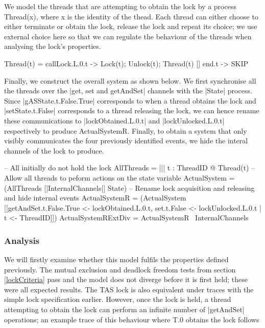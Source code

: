 We model the threads that are attempting to obtain the lock by a process Thread(x), where x is the identity of the thead. Each thread can either choose to either terminate or obtain the lock, release the lock and repeat its choice; we use external choice here so that we can regulate the  behaviour of the threads when analysing the lock's properties.

\begin{cspm}
  Thread(t) = callLock.L.0.t -> Lock(t); Unlock(t); Thread(t)
              [] end.t -> SKIP
\end{cspm}

Finally, we construct the overall system as shown below. We first synchronise all the threads over the |get, set and getAndSet| channels with the |State| process. Since |gASState.t.False.True| corresponds to when a thread obtains the lock and |setState.t.False| corresponds to a thread releasing the lock, we can hence rename these communications to |lockObtained.L.0.t| and |lockUnlocked.L.0.t| respectively to produce ActualSystemR. Finally, to obtain a system that only visibly communicates the four previously identified events, we hide the interal channels of the lock to produce.

\begin{cspm}
  -- All initially do not hold the lock
  AllThreads = ||| t : ThreadID @ Thread(t)
  -- Allow all threads to peform actions on the state variable
  ActualSystem = (AllThreads [|InternalChannels|] State)
  -- Rename lock acquisition and releasing and hide internal events
  ActualSystemR = (ActualSystem 
                    [[getAndSet.t.False.True <- lockObtained.L.0.t, 
                    set.t.False <- lockUnlocked.L.0.t | t <- ThreadID]])
  ActualSystemRExtDiv = ActualSystemR \ InternalChannels
\end{cspm}

\subsubsection{Analysis}

We will firstly examine whether this model fulfils the properties defined previously. The mutual exclusion and deadlock freedom tests from section \ref{lockCriteria} pass and the model does not diverge before it is first held; these were all expected results. The TAS lock is also equivalent under traces with the simple lock specification earlier. However, once the lock is held, a thread attempting to obtain the lock can perform an infinite number of |getAndSet| operations; an example trace of this behaviour where T.0 obtains the lock follows

